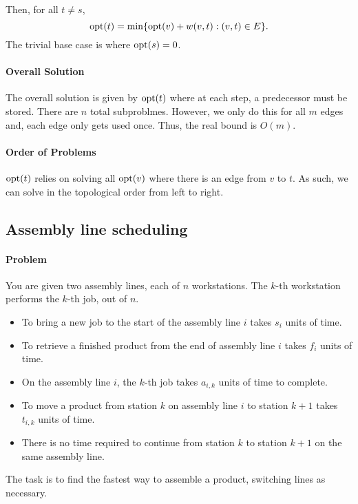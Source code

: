 Then, for all \(t \neq s\),  \[
  \mathrm{opt}(t) = \min \{
    \mathrm{opt}(v) + w(v, t) : (v, t) \in E
  \} 
.\] 
The trivial base case is where \(\mathrm{opt}(s) = 0\).

\paragraph{Overall Solution}
The overall solution is given by \(\mathrm{opt}(t)\) where at each step, a predecessor must be stored.
There are \(n\) total subproblmes. However, we only do this  for all \(m\) edges and,
each edge only gets used once. Thus, the real bound is  \(O(m)\).

\paragraph{Order of Problems}
\(\mathrm{opt}(t)\) relies on solving all  \(\mathrm{opt}(v)\) where there is an edge from \(v\) to  \(t\).
As such, we can solve in the topological order from left to right.

\subsection{Assembly line scheduling}
\paragraph{Problem}
You are given two assembly lines, each of  \(n\) workstations. The  \(k\)-th workstation
performs the \(k\)-th job, out of  \(n\).

\begin{itemize}
  \item To bring a new job to the start of the assembly line \(i\) takes
    \(s_i\) units of time.
  \item To retrieve a finished product from the end of assembly line \(i\)
    takes  \(f_i\) units of time.
  \item On the assembly line \(i\), the  \(k\)-th job takes  \(a_{i, k}\) 
    units of time to complete.
  \item To move a product from station \(k\) on assembly line  \(i\) to station
    \(k + 1\) takes  \(t_{i, k}\) units of time.
  \item There is no time required to continue from station \(k\) to station
     \(k + 1\) on the same assembly line.
\end{itemize}

The task is to find the fastest way to assemble a product, switching lines
as necessary.

